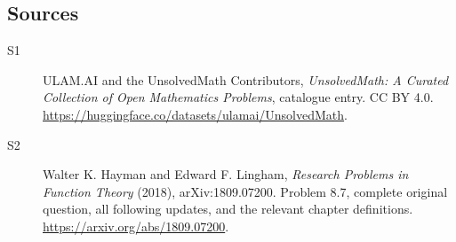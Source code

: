 \documentclass[11pt]{book}
\begin{document}
\subsection{Sources}
\begin{description}
\item[\hypertarget{source:statement:1}{S1}] ULAM.AI and the UnsolvedMath Contributors, \emph{UnsolvedMath: A Curated Collection of Open Mathematics Problems}, catalogue entry. CC BY 4.0. \url{https://huggingface.co/datasets/ulamai/UnsolvedMath}.
\item[\hypertarget{source:statement:2}{S2}] Walter K. Hayman and Edward F. Lingham, \emph{Research Problems in Function Theory} (2018), arXiv:1809.07200. Problem 8.7, complete original question, all following updates, and the relevant chapter definitions. \url{https://arxiv.org/abs/1809.07200}.
\end{description}
\label{end:statement}
\end{document}

